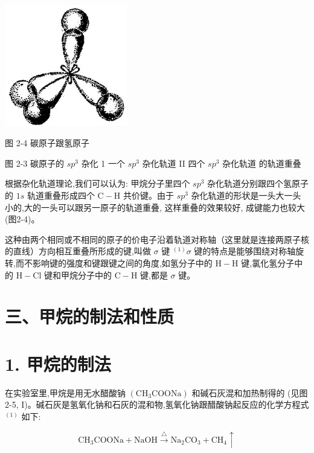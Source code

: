 \documentclass[10pt]{article}
\begin{document}
\begin{center}
\includegraphics[max width=0.4\textwidth]{images/01912d16-be99-77bb-9535-4f3ed8d9946f_54_921142.jpg}
\end{center}

图 2-4 碳原子跟氢原子

图 2-3 碳原子的 \(s{p}^{3}\) 杂化 1 一个 \(s{p}^{3}\) 杂化轨道 II 四个 \(s{p}^{3}\) 杂化轨道 的轨道重叠

根据杂化轨道理论,我们可以认为: 甲烷分子里四个 \(s{p}^{3}\) 杂化轨道分别跟四个氢原子的 \({1s}\) 轨道重叠形成四个 \(\mathrm{C} - \mathrm{H}\) 共价键。由于 \(s{p}^{3}\) 杂化轨道的形状是一头大一头小的,大的一头可以跟另一原子的轨道重叠, 这样重叠的效果较好, 成键能力也较大 (图2-4)。

这种由两个相同或不相同的原子的价电子沿着轨道对称轴（这里就是连接两原子核的直线）方向相互重叠所形成的键,叫做 \(\sigma\) 键 \({}^{\left( 1\right) }\sigma\) 键的特点是能够围绕对称轴旋转,而不影响键的强度和键跟键之间的角度,如氢分子中的 \(\mathrm{H} - \mathrm{H}\) 键,氯化氢分子中的 \(\mathrm{H} - \mathrm{{Cl}}\) 键和甲烷分子中的 \(\mathrm{C} - \mathrm{H}\) 键,都是 \(\sigma\) 键。

\section*{三、甲烷的制法和性质}

\section*{1. 甲烷的制法}

在实验室里,甲烷是用无水醋酸钠 \(\left( {{\mathrm{{CH}}}_{3}\mathrm{{COONa}}}\right)\) 和碱石灰混和加热制得的 (见图 2-5, I)。碱石灰是氢氧化钠和石灰的混和物,氢氧化钠跟醋酸钠起反应的化学方程式 \({}^{\left( 1\right) }\) 如下:

\[
{\mathrm{{CH}}}_{3}\mathrm{{COONa}} + \mathrm{{NaOH}}\xrightarrow[]{\bigtriangleup }{\mathrm{{Na}}}_{2}{\mathrm{{CO}}}_{3} + {\mathrm{{CH}}}_{4} \uparrow
\]
\end{document}
